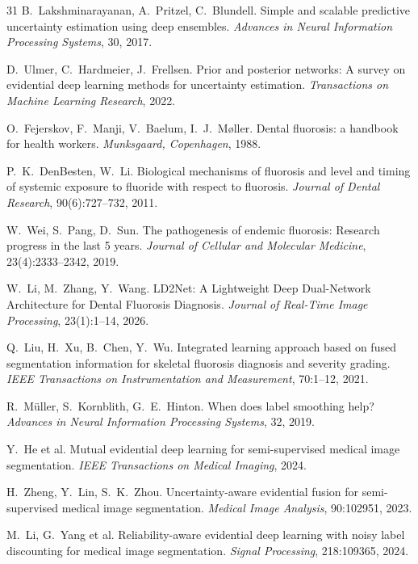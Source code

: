 \documentclass[12pt,a4paper]{ctexart}
\begin{document}
\begin{thebibliography}{31}
B.\ Lakshminarayanan, A.\ Pritzel, C.\ Blundell.
Simple and scalable predictive uncertainty estimation using deep ensembles.
\textit{Advances in Neural Information Processing Systems}, 30, 2017.

D.\ Ulmer, C.\ Hardmeier, J.\ Frellsen.
Prior and posterior networks: A survey on evidential deep learning methods for uncertainty estimation.
\textit{Transactions on Machine Learning Research}, 2022.

O.\ Fejerskov, F.\ Manji, V.\ Baelum, I.\ J.\ M\o ller.
Dental fluorosis: a handbook for health workers.
\textit{Munksgaard, Copenhagen}, 1988.

P.\ K.\ DenBesten, W.\ Li.
Biological mechanisms of fluorosis and level and timing of systemic exposure to fluoride with respect to fluorosis.
\textit{Journal of Dental Research}, 90(6):727--732, 2011.

W.\ Wei, S.\ Pang, D.\ Sun.
The pathogenesis of endemic fluorosis: Research progress in the last 5 years.
\textit{Journal of Cellular and Molecular Medicine}, 23(4):2333--2342, 2019.

W.\ Li, M.\ Zhang, Y.\ Wang.
LD2Net: A Lightweight Deep Dual-Network Architecture for Dental Fluorosis Diagnosis.
\textit{Journal of Real-Time Image Processing}, 23(1):1--14, 2026.

Q.\ Liu, H.\ Xu, B.\ Chen, Y.\ Wu.
Integrated learning approach based on fused segmentation information for skeletal fluorosis diagnosis and severity grading.
\textit{IEEE Transactions on Instrumentation and Measurement}, 70:1--12, 2021.

R.\ M\"uller, S.\ Kornblith, G.\ E.\ Hinton.
When does label smoothing help?
\textit{Advances in Neural Information Processing Systems}, 32, 2019.

Y.\ He et al.
Mutual evidential deep learning for semi-supervised medical image segmentation.
\textit{IEEE Transactions on Medical Imaging}, 2024.

H.\ Zheng, Y.\ Lin, S.\ K.\ Zhou.
Uncertainty-aware evidential fusion for semi-supervised medical image segmentation.
\textit{Medical Image Analysis}, 90:102951, 2023.

M.\ Li, G.\ Yang et al.
Reliability-aware evidential deep learning with noisy label discounting for medical image segmentation.
\textit{Signal Processing}, 218:109365, 2024.


\end{thebibliography}
\end{document}
